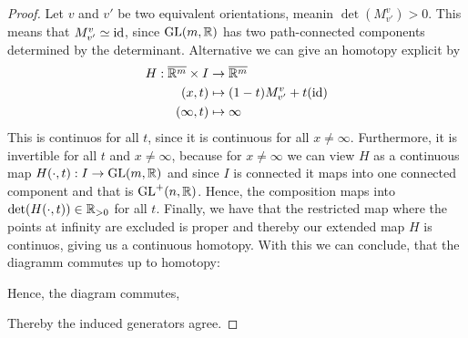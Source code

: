 \begin{proof}
Let $v$ and $v'$ be two equivalent orientations, meanin $\det(M^v_{v'})>0$. This means that $M^v_{v'}\simeq \text{id}$, since $\operatorname{GL}(m, \mathbb{R})$ has two path-connected components determined by the determinant. Alternative we can give an homotopy explicit by 
\begin{align*}
    H: \overline{\mathbb{R}^m}\times I & \to        \overline{\mathbb{R}^m}\\
    (x,t)                      & \mapsto    (1-t)M^v_{v'}+t(\text{id}) \\
    (\infty,t)                 & \mapsto \infty
\end{align*}
This is continuos for all $t$, since it is continuous for all $x\neq \infty$. Furthermore, it is invertible for all $t$ and $x\neq \infty$, because for $x\neq \infty $ we can view $H$ as a continuous map $H(\cdot,t):I\to \operatorname{GL}(m, \mathbb{R})$ and since $I$ is connected it maps into one connected component and that is $\operatorname{GL}^+(n,\mathbb{R})$. Hence, the composition maps into $\det(H(\cdot,t))\in \mathbb{R}_{>0}$ for all $t$. Finally, we have that the restricted map where the points at infinity are excluded is proper and thereby our extended map $H$ is continuos, giving us a continuous homotopy. With this we can conclude, that the diagramm commutes up to homotopy:
\begin{center}
\end{center}
Hence, the diagram commutes, 
\begin{center}
\end{center}
Thereby the induced generators agree.
\end{proof}
